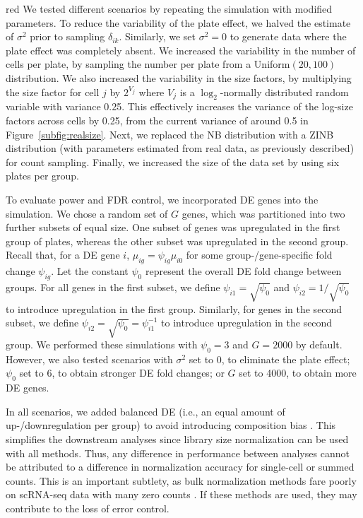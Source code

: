\documentclass{article}
\begin{document}
\begin{color}{red}
We tested different scenarios by repeating the simulation with modified parameters.
To reduce the variability of the plate effect, we halved the estimate of $\sigma^2$ prior to sampling $\delta_{ik}$.
Similarly, we set $\sigma^2=0$ to generate data where the plate effect was completely absent.
We increased the variability in the number of cells per plate, by sampling the number per plate from a Uniform$(20, 100)$ distribution.
We also increased the variability in the size factors, by multiplying the size factor for cell $j$ by $2^{V_j}$ where $V_j$ is a $\log_2$-normally distributed random variable with variance 0.25.
This effectively increases the variance of the log-size factors across cells by 0.25, from the current variance of around 0.5 in Figure~\ref{subfig:realsize}.
Next, we replaced the NB distribution with a ZINB distribution (with parameters estimated from real data, as previously described) for count sampling.
Finally, we increased the size of the data set by using six plates per group.

To evaluate power and FDR control, we incorporated DE genes into the simulation.
We chose a random set of $G$ genes, which was partitioned into two further subsets of equal size.
One subset of genes was upregulated in the first group of plates, whereas the other subset was upregulated in the second group.
Recall that, for a DE gene $i$, $\mu_{ig} = \psi_{ig}\mu_{i0}$ for some group-/gene-specific fold change $\psi_{ig}$.
Let the constant $\psi_0$ represent the overall DE fold change between groups.
For all genes in the first subset, we define $\psi_{i1} = \sqrt{\psi_0}$ and $\psi_{i2} = 1/\sqrt{\psi_0}$ to introduce upregulation in the first group.
Similarly, for genes in the second subset, we define $\psi_{i2} = \sqrt{\psi_0} = \psi_{i1}^{-1}$ to introduce upregulation in the second group.
We performed these simulations with $\psi_0=3$ and $G=2000$ by default.
However, we also tested scenarios with $\sigma^2$ set to 0, to eliminate the plate effect; $\psi_0$ set to 6, to obtain stronger DE fold changes; or $G$ set to 4000, to obtain more DE genes.

In all scenarios, we added balanced DE (i.e., an equal amount of up-/downregulation per group) to avoid introducing composition bias \citep{robinson2010scaling}.
This simplifies the downstream analyses since library size normalization can be used with all methods.
Thus, any difference in performance between analyses cannot be attributed to a difference in normalization accuracy for single-cell or summed counts.
This is an important subtlety, as bulk normalization methods fare poorly on scRNA-seq data with many zero counts \citep{lun2016pooling}.
If these methods are used, they may contribute to the loss of error control.
\end{color}
\end{document}
